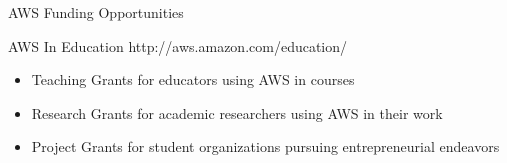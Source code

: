 \begin{frame}{AWS Funding Opportunities}
	\begin{block}{AWS In Education}
	http://aws.amazon.com/education/
	\end{block}
	\begin{itemize}
		\item Teaching Grants for educators using AWS in courses
		\item Research Grants for academic researchers using AWS in their work
		\item Project Grants for student organizations pursuing entrepreneurial endeavors
	\end{itemize}
\end{frame}
